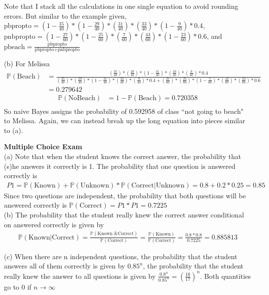 \documentclass{homeworg}
\begin{document}
Note that I stack all the calculations in one single equation to avoid rounding errors. But similar to the example given, $\text{pbpropto}=(1-\frac{35}{40})*(1-\frac{29}{40})*(\frac{31}{40})*(\frac{33}{40})*(1-\frac{9}{40})*0.4$, $\text{pnbpropto}=(1-\frac{27}{60})*(1-\frac{25}{60})*(\frac{7}{60})*(\frac{43}{60})*(1-\frac{23}{60})*0.6$, and $\text{pbeach}=\frac{\text{pbpropto}}{\text{pbpropto+pnbpropto}}$

(b) For Melissa
\begin{align*}
\mathbb{P}(\text{Beach})&=\frac{(\frac{35}{40})*(\frac{29}{40})*(1-\frac{31}{40})*(\frac{33}{40})*(\frac{9}{40})*0.4}{(\frac{35}{40})*(\frac{29}{40})*(1-\frac{31}{40})*(\frac{33}{40})*(\frac{9}{40})*0.4+(\frac{27}{60})*(\frac{25}{60})*(1-\frac{7}{60})*(\frac{43}{60})*(\frac{23}{60})*0.6}\\
&=0.279642
\end{align*}
\begin{align*}
\mathbb{P}(\text{NoBeach})& =1-\mathbb{P}(\text{Beach})=0.720358\\
\end{align*}
So naive Bayes assigns the probability of 0.592958 of class ``not going to beach" to Melissa. Again, we can instead break up the long equation into pieces similar to (a).

\exercise 
\textbf{Multiple Choice Exam} \\

(a) Note that when the student knows the correct answer, the probability that (s)he answers it correctly is 1. The probability that one question is answered correctly is
\begin{align*}
P1=\mathbb{P}(\text{Known})+\mathbb{P}(\text{Unknown})*\mathbb{P}(\text{Correct}|\text{Unknown})=0.8+0.2*0.25=0.85
\end{align*}
Since two questions are independent, the probability that both questions will be answered correctly is $\mathbb{P}(\text{Correct})=P1*P1=0.7225$\\

(b) The probability that the student really knew the correct answer conditional on answered correctly is given by 
\begin{align*}
\mathbb{P}(\text{Known}|\text{Correct})=\frac{\mathbb{P}(\text{Known \& Correct})}{\mathbb{P}(\text{Correct})}=\frac{\mathbb{P}(\text{Known})}{\mathbb{P}(\text{Correct})}=\frac{0.8*0.8}{0.7225}=0.885813
\end{align*}

(c) When there are n independent questions, the probability that the student answers all of them correctly is given by $0.85^{n}$, the probability that the student really knew the answer to all questions is given by $\frac{0.8^n}{0.85^n}=(\frac{16}{17})^n$. Both quantities go to 0 if $n\to\infty$
%
%


%
%
\end{document}
